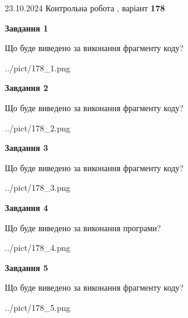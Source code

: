\documentclass[12pt, ukrainian]{article}
\begin{document}
{\Large{23.10.2024 Контрольна робота , варіант  \No \textbf { 178 }\par}}
{
\begin {large}
{\begin {center}\textbf{Завдання 1}\end {center}}

Що буде виведено за виконання фрагменту коду?\par
\begin{center}
	{../pict/178_1.png}
\end{center}
\newpage

{\begin {center}\textbf{Завдання 2}\end {center}}

Що буде виведено за виконання фрагменту коду?\par
\begin{center}
	{../pict/178_2.png}
\end{center}
\newpage

{\begin {center}\textbf{Завдання 3}\end {center}}

Що буде виведено за виконання фрагменту коду?\par
\begin{center}
	{../pict/178_3.png}
\end{center}
\newpage

{\begin {center}\textbf{Завдання 4}\end {center}}

Що буде виведено за виконання програми?\par
\begin{center}
	{../pict/178_4.png}
\end{center}
\newpage

{\begin {center}\textbf{Завдання 5}\end {center}}

Що буде виведено за виконання фрагменту коду?\par
\begin{center}
	{../pict/178_5.png}
\end{center}
\newpage


\end{large}}
\end{document}
